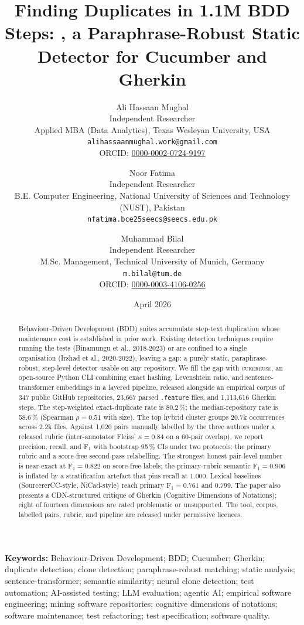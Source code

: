 \documentclass[11pt,a4paper]{article}
\title{Finding Duplicates in 1.1M BDD Steps: \tool, a Paraphrase-Robust Static Detector for Cucumber and Gherkin}
\author{%
  Ali Hassaan Mughal\\
  Independent Researcher\\
  Applied MBA (Data Analytics), Texas Wesleyan University, USA\\
  \texttt{alihassaanmughal.work@gmail.com}\\
  ORCID: \href{https://orcid.org/0000-0002-0724-9197}{0000-0002-0724-9197}
  \and
  Noor Fatima\\
  Independent Researcher\\
  B.E. Computer Engineering, National University of Sciences and
  Technology (NUST), Pakistan\\
  \texttt{nfatima.bce25seecs@seecs.edu.pk}
  \and
  Muhammad Bilal\\
  Independent Researcher\\
  M.Sc. Management, Technical University of Munich, Germany\\
  \texttt{m.bilal@tum.de}\\
  ORCID: \href{https://orcid.org/0000-0003-4106-0256}{0000-0003-4106-0256}
}
\date{April 2026}
\newcommand{\tool}{\textsc{cukereuse}\xspace}
\begin{document}
\maketitle

\begin{abstract}
Behaviour-Driven Development (BDD) suites accumulate step-text
duplication whose maintenance cost is established in prior work.
Existing detection techniques require running the tests (Binamungu
et al., 2018-2023) or are confined to a single organisation
(Irshad et al., 2020-2022), leaving a gap: a purely static,
paraphrase-robust, step-level detector usable on any repository.
We fill the gap with \tool, an open-source Python CLI combining
exact hashing, Levenshtein ratio, and sentence-transformer
embeddings in a layered pipeline, released alongside an empirical
corpus of 347 public GitHub repositories, 23{,}667 parsed
\texttt{.feature} files, and 1{,}113{,}616 Gherkin steps. The
step-weighted exact-duplicate rate is 80.2\,\%; the
median-repository rate is 58.6\,\% (Spearman $\rho = 0.51$ with
size). The top hybrid cluster groups 20.7k occurrences across 2.2k
files. Against 1{,}020 pairs manually labelled by the three authors
under a released rubric (inter-annotator Fleiss' $\kappa = 0.84$ on
a 60-pair overlap), we report precision, recall, and F$_1$ with
bootstrap 95\,\% CIs under two protocols: the primary rubric and a
score-free second-pass relabelling. The strongest honest pair-level
number is near-exact at F$_1 = 0.822$ on score-free labels; the
primary-rubric semantic F$_1 = 0.906$ is inflated by a
stratification artefact that pins recall at 1.000. Lexical
baselines (SourcererCC-style, NiCad-style) reach primary
F$_1 = 0.761$ and $0.799$. The paper also presents a CDN-structured
critique of Gherkin (Cognitive Dimensions of Notations); eight of
fourteen dimensions are rated problematic or unsupported. The tool,
corpus, labelled pairs, rubric, and pipeline are released under
permissive licences.
\end{abstract}

\vspace{1ex}
\noindent\textbf{Keywords:} Behaviour-Driven Development; BDD;
Cucumber; Gherkin; duplicate detection; clone detection;
paraphrase-robust matching; static analysis; sentence-transformer;
semantic similarity; neural clone detection; test automation;
AI-assisted testing; LLM evaluation; agentic AI;
empirical software engineering; mining software
repositories; cognitive dimensions of notations; software
maintenance; test refactoring; test specification; software quality.
\end{document}
